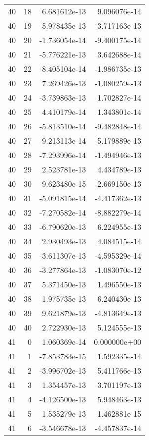 \begin{tabular}{rrrr}
  40 &   18 &  6.681612e-13 &  9.096076e-14 \\
  40 &   19 & -5.978435e-13 & -3.717163e-13 \\
  40 &   20 & -1.736054e-14 & -9.400175e-14 \\
  40 &   21 & -5.776221e-13 &  3.642688e-14 \\
  40 &   22 &  8.405104e-14 & -1.986735e-13 \\
  40 &   23 &  7.269426e-13 & -1.080259e-13 \\
  40 &   24 & -3.739863e-13 &  1.702827e-14 \\
  40 &   25 &  4.410179e-14 &  1.343801e-14 \\
  40 &   26 & -5.813510e-14 & -9.482848e-14 \\
  40 &   27 &  9.213113e-14 & -5.179889e-13 \\
  40 &   28 & -7.293996e-14 & -1.494946e-13 \\
  40 &   29 &  2.523781e-13 &  4.434789e-13 \\
  40 &   30 &  9.623480e-15 & -2.669150e-13 \\
  40 &   31 & -5.091815e-14 & -4.417362e-13 \\
  40 &   32 & -7.270582e-14 & -8.882279e-14 \\
  40 &   33 & -6.790620e-13 &  6.224955e-13 \\
  40 &   34 &  2.930493e-13 &  4.084515e-14 \\
  40 &   35 & -3.611307e-13 & -4.595329e-14 \\
  40 &   36 & -3.277864e-13 & -1.083070e-12 \\
  40 &   37 &  5.371450e-13 &  1.496550e-13 \\
  40 &   38 & -1.975735e-13 &  6.240430e-13 \\
  40 &   39 &  9.621879e-13 & -4.813649e-13 \\
  40 &   40 &  2.722930e-13 &  5.124555e-13 \\
  41 &    0 &  1.060369e-14 &  0.000000e+00 \\
  41 &    1 & -7.853783e-15 &  1.592335e-14 \\
  41 &    2 & -3.996702e-13 &  5.411766e-13 \\
  41 &    3 &  1.354457e-13 &  3.701197e-13 \\
  41 &    4 & -4.126500e-13 &  5.948463e-13 \\
  41 &    5 &  1.535279e-13 & -1.462881e-15 \\
  41 &    6 & -3.546678e-13 & -4.457837e-14 \\

\end{tabular}

